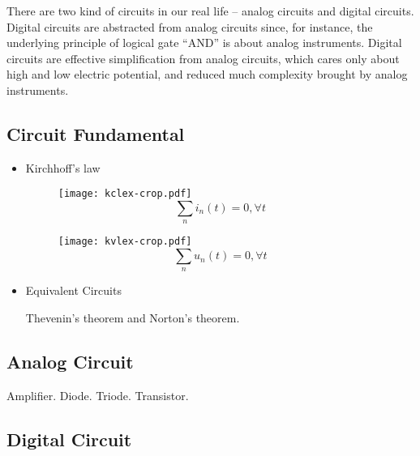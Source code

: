 
There are two kind of circuits in our real life -- analog circuits and
digital circuits. Digital circuits are abstracted from analog circuits
since, for instance, the underlying principle of logical gate ``AND''
is about analog instruments. Digital circuits are effective simplification
from analog circuits, which cares only about high and low electric potential,
and reduced much complexity brought by analog instruments.

\subsection{Circuit Fundamental}

\begin{itemize}

 \item{Kirchhoff's law}

  \begin{figure}[!h]
   \centering
   \texttt{[image: kclex-crop.pdf]}
  $$ \sum_n i_n(t) = 0, \forall t $$
  \end{figure}

  \begin{figure}[!h]
   \centering
   \texttt{[image: kvlex-crop.pdf]}
  $$ \sum_n u_n(t) = 0, \forall t $$
  \end{figure}

 \item{Equivalent Circuits}

  Thevenin's theorem and Norton's theorem.
\end{itemize}

\subsection{Analog Circuit}

  Amplifier. Diode. Triode. Transistor.

\subsection{Digital Circuit}

